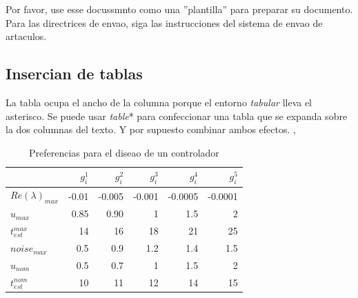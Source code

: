 \documentclass[5p,times,authoryear]{elsarticle}
\begin{document}
Por favor, use esse docussmnto como una ''plantilla'' para preparar su documento. Para las directrices de envao, siga las instrucciones del sistema de envao de artaculos.

\subsection{Insercian de tablas}

La tabla ocupa el ancho de la columna porque el entorno \emph{tabular} lleva el asterisco. Se puede usar \emph{table}* para confeccionar una tabla que se expanda sobre la dos columnas del texto. Y por supuesto combinar ambos efectos. \citep{Heritage:92}, \citep{ChaRou:66}


\begin{table}[htbp]
  \caption{Preferencias para el diseao de un controlador}
   \label{extremos45}
  \begin{tabular*}{\hsize}{lrrrrr}
\hline
    & $g_i^1$ & $g_i^2$ & $g_i^3$ & $g_i^4$ & $g_i^5$ \\
    \hline
$Re(\lambda)_{max}$ & -0.01  & -0.005 & -0.001 & -0.0005 & -0.0001 \\
$u_{max}$& 0.85 & 0.90 & 1 & 1.5 & 2  \\
$t_{est}^{max}$& 14 & 16 & 18 & 21 & 25 \\
$noise_{max}$& 0.5 & 0.9 & 1.2 & 1.4 & 1.5  \\
$u_{nom}$& 0.5 & 0.7 & 1  & 1.5 & 2  \\
$t_{est}^{nom}$& 10 & 11 & 12 & 14 & 15 \\
\hline
  \end{tabular*}
\end{table}
\end{document}
